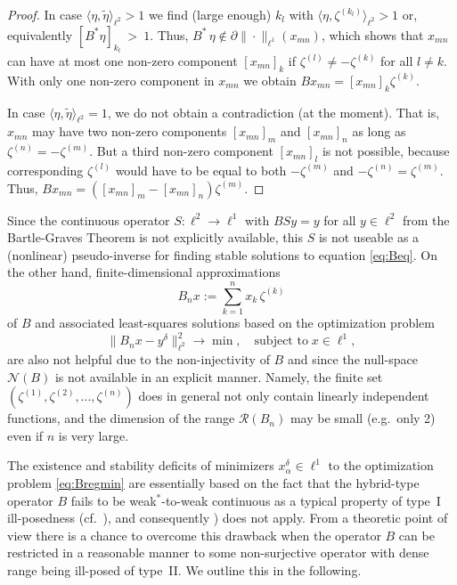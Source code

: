 \documentclass[12pt,twoside,reqno]{amsart}
\theoremstyle{definition}
\numberwithin{equation}{section}
\begin{document}
\begin{proof}
\par
In case $\langle\eta,\tilde{\eta}\rangle_{\ell^2}>1$ we find (large enough) $k_l$ with $\langle\eta,\zeta^{(k_l)}\rangle_{\ell^2}>1$ or, equivalently $[B^\ast\eta]_{k_l}~>~1$. Thus, $B^\ast\,\eta\notin\partial\|\cdot\|_{\ell^1}(x_{mn})$, which shows that $x_{mn}$ can have at most one non-zero component $[x_{mn}]_k$ if $\zeta^{(l)}\neq-\zeta^{(k)}$ for all $l\neq k$. With only one non-zero component in $x_{mn}$ we obtain $Bx_{mn}=[x_{mn}]_k\zeta^{(k)}$.
\par
In case $\langle\eta,\tilde{\eta}\rangle_{\ell^2}=1$, we do not obtain a contradiction (at the moment). That is, $x_{mn}$ may have two non-zero components $[x_{mn}]_m$ and $[x_{mn}]_n$ as long as $\zeta^{(n)}=-\zeta^{(m)}$. But a third non-zero component $[x_{mn}]_l$ is not possible, because corresponding $\zeta^{(l)}$ would have to be equal to both $-\zeta^{(m)}$ and $-\zeta^{(n)}=\zeta^{(m)}$. Thus, $Bx_{mn}=([x_{mn}]_m-[x_{mn}]_n)\zeta^{(m)}$.
\end{proof}

Since the continuous operator $S: \ell^2 \to \ell^1$ with $BSy=y$ for all $y \in \ell^2$ from the Bartle-Graves Theorem
is not explicitly available, this $S$ is not useable  as a (nonlinear) pseudo-inverse for finding stable solutions to equation \eqref{eq:Beq}.
On the other hand, finite-dimensional approximations
$$B_n x:=\sum_{k=1}^n x_k\,\zeta^{(k)}$$
of $B$ and associated least-squares solutions based on the optimization problem
\begin{equation} \label{eq:Bfinite}
 \|B_n x-y^\delta\|^2_{\ell^2} \to \min, \quad \mbox{subject to} \; x \in \ell^1,
\end{equation}
are also not helpful due to the non-injectivity of $B$ and since the null-space $\mathcal{N}(B)$ is not available in an explicit manner. Namely, the finite set $(\zeta^{(1)},\zeta^{(2)},..., \zeta^{(n)})$ does in general not only contain linearly independent functions, and the dimension of the range $\mathcal{R}(B_n)$ may be small (e.g.~only 2) even if $n$ is very large.

The existence and stability deficits of minimizers $x_\alpha^\delta \in \ell^1$ to the optimization problem \eqref{eq:Bregmin} are essentially based on the fact that the hybrid-type operator $B$ fails to be weak$^*$-to-weak continuous as a typical property of type~I ill-posedness (cf.~\cite[Theorem~3.2]{FleHof25}), and consequently \cite[Proposition~3.1]{FleHof25}) does not apply. From a theoretic point of view there is a chance to overcome this drawback when the operator $B$ can be restricted in a reasonable manner to some non-surjective operator with dense range being ill-posed of type~II. We outline this in the following.
\end{document}
